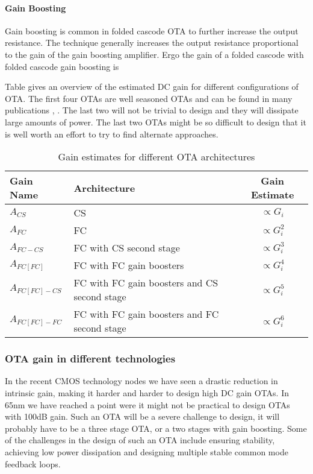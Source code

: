 \paragraph{Gain Boosting}
Gain boosting is common in folded cascode OTA to further increase the
output resistance. The technique generally increases the output
resistance proportional to the gain of the gain boosting
amplifier. Ergo the gain of a folded cascode with folded cascode gain
boosting is


Table \label{tab:otagain} gives an overview of the estimated DC gain for
different configurations of OTA. The first four OTAs  are well seasoned
OTAs and can be found in many publications \cite{berntsen05}, \cite{ahmed05}. The last
two will not be trivial to design and they will dissipate large amounts of
power. The last two OTAs might be so difficult to design that it is well
worth an effort to try to find alternate approaches.

\begin{table}[ht]
\caption{Gain estimates for different OTA architectures}
\centering 
\begin{tabular}{ l | l | c }

\label{tab:otagain}
Gain Name&Architecture & Gain Estimate\\
\hline 
$A_{CS}$&CS & $\propto G_i$\\\hline 
$A_{FC}$&FC & $\propto G_i^2$\\\hline 
$A_{FC-CS}$&FC with CS second stage & $\propto G_i^3$\\\hline 
$A_{FC[FC]}$&FC with FC gain boosters & $\propto G_i^4$\\\hline 
$A_{FC[FC]-CS}$&FC with FC gain boosters and CS second stage & $\propto G_i^5$\\\hline 
$A_{FC[FC]-FC}$&FC with FC gain boosters and FC second stage & $\propto G_i^6$\\
\end{tabular}
\end{table}


\subsubsection{OTA gain in different technologies}

In the recent CMOS technology nodes we have seen a drastic reduction in
intrinsic gain, making it harder and harder to design high DC gain
OTAs. In 65nm we have reached a point were it might not be practical
to design OTAs with 100dB gain. Such an OTA will be a severe challenge
to design, it will probably have to be a three stage OTA, or a two
stages with gain boosting. Some of the challenges in the design of
such an OTA include ensuring stability, achieving low power
dissipation and designing multiple stable common mode
feedback loops.

